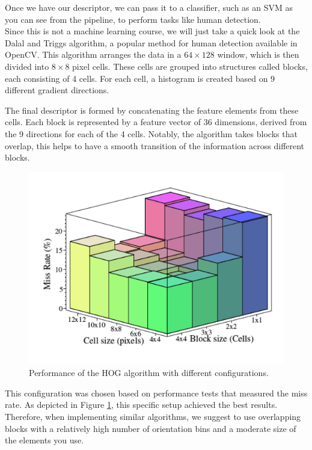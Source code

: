 Once we have our descriptor, we can pass it to a classifier, such as an SVM as you can see from the pipeline, to perform tasks like human detection. 
\\
Since this is not a machine learning course, we will just take a quick look at the Dalal and Triggs algorithm, a popular method for human detection available in OpenCV. This algorithm arranges the data in a $64\times128$ window, which is then divided into $8\times8$ pixel cells. These cells are grouped into structures called blocks, each consisting of 4 cells. For each cell, a histogram is created based on 9 different gradient directions.

The final descriptor is formed by concatenating the feature elements from these cells. Each block is represented by a feature vector of 36 dimensions, derived from the 9 directions for each of the 4 cells. Notably, the algorithm takes blocks that overlap, this helps to have a smooth transition of the information across different blocks.

\begin{figure}
    \includegraphics[scale=0.3]{Figures/Performance.png}
    \caption{Performance of the HOG algorithm with different configurations.}
    \label{fig:Performance}
\end{figure}
This configuration was chosen based on performance tests that measured the miss rate. As depicted in Figure \ref{fig:Performance}, this specific setup achieved the best results. Therefore, when implementing similar algorithms, we suggest to use overlapping blocks with a relatively high number of orientation bins and a moderate size of the elements you use.
